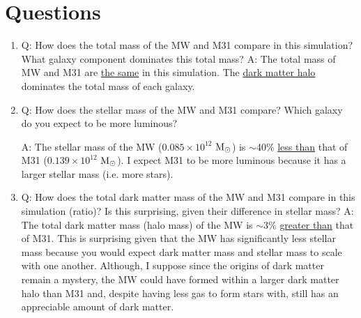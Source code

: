 \documentclass{aastex62}
\begin{document}
\section{Questions}
\begin{enumerate}
  \item Q: How does the total mass of the MW and M31 compare in this simulation? What galaxy component dominates this total mass?
  \newline
  \newline
  A: The total mass of MW and M31 are \underline{the same} in this simulation. The \underline{dark matter halo} dominates the total mass of each galaxy.
  \item Q: How does the stellar mass of the MW and M31 compare? Which galaxy do you expect to be more luminous?
  \newline
  
  A: The stellar mass of the MW ($0.085\times10^{12}$ \(\textup{M}_\odot\)) is $\sim$40\% \underline{less than} that of M31 ($0.139\times10^{12}$ \(\textup{M}_\odot\)). I expect M31 to be more luminous because it has a larger stellar mass (i.e. more stars).
  \item Q: How does the total dark matter mass of the MW and M31 compare in this simulation (ratio)? Is this surprising, given their difference in stellar mass?
  \newline
  \newline
  A: The total dark matter mass (halo mass) of the MW is $\sim$3\% \underline{greater than} that of M31. This is surprising given that the MW has significantly less stellar mass because you would expect dark matter mass and stellar mass to scale with one another. Although, I suppose since the origins of dark matter remain a mystery, the MW could have formed within a larger dark matter halo than M31 and, despite having less gas to form stars with, still has an appreciable amount of dark matter.
  

\end{enumerate}
\end{document}
